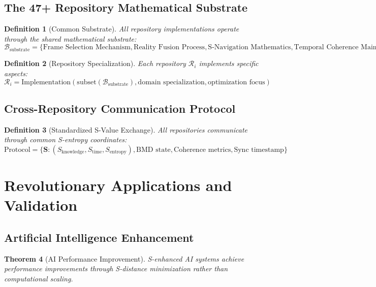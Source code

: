 \documentclass[12pt,a4paper]{article}
\newtheorem{theorem}{Theorem}[section]
\newtheorem{definition}[theorem]{Definition}
\begin{document}
\subsection{The 47+ Repository Mathematical Substrate}

\begin{definition}[Common Substrate]
All repository implementations operate through the shared mathematical substrate:
\begin{equation}
\mathcal{B}_{\text{substrate}} = \{
\text{Frame Selection Mechanism}, 
\text{Reality Fusion Process}, 
\text{S-Navigation Mathematics}, 
\text{Temporal Coherence Maintenance}
\}
\end{equation}
\end{definition}

\begin{definition}[Repository Specialization]
Each repository $\mathcal{R}_i$ implements specific aspects:
\begin{equation}
\mathcal{R}_i = \text{Implementation}(
\text{subset}(\mathcal{B}_{\text{substrate}}), 
\text{domain specialization}, 
\text{optimization focus}
)
\end{equation}
\end{definition}

\subsection{Cross-Repository Communication Protocol}

\begin{definition}[Standardized S-Value Exchange]
All repositories communicate through common S-entropy coordinates:
\begin{equation}
\text{Protocol} = \{
\mathbf{S}: (S_{\text{knowledge}}, S_{\text{time}}, S_{\text{entropy}}),
\text{BMD state},
\text{Coherence metrics},
\text{Sync timestamp}
\}
\end{equation}
\end{definition}

\section{Revolutionary Applications and Validation}

\subsection{Artificial Intelligence Enhancement}

\begin{theorem}[AI Performance Improvement]
S-enhanced AI systems achieve performance improvements through S-distance minimization rather than computational scaling.
\end{theorem}
\end{document}
